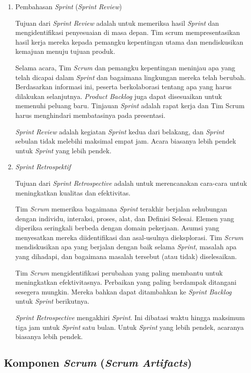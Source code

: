 \begin{enumerate}
		\item Pembahasan \emph{Sprint} (\emph{Sprint Review})
		
		Tujuan dari \emph{Sprint Review} adalah untuk memeriksa hasil \emph{Sprint} dan mengidentifikasi penyesuaian di masa depan. Tim scrum mempresentasikan hasil kerja mereka kepada pemangku kepentingan utama dan mendiskusikan kemajuan menuju tujuan produk.

		Selama acara, Tim \emph{Scrum} dan pemangku kepentingan meninjau apa yang telah dicapai dalam \emph{Sprint} dan bagaimana lingkungan mereka telah berubah. Berdasarkan informasi ini, peserta berkolaborasi tentang apa yang harus dilakukan selanjutnya. \emph{Product Backlog} juga dapat disesuaikan untuk memenuhi peluang baru. Tinjauan \emph{Sprint} adalah rapat kerja dan Tim Scrum harus menghindari membatasinya pada presentasi.

		\emph{Sprint Review} adalah kegiatan \emph{Sprint} kedua dari belakang, dan \emph{Sprint} sebulan tidak melebihi maksimal empat jam. Acara biasanya lebih pendek untuk \emph{Sprint} yang lebih pendek.
				
		\item \emph{Sprint Retrospektif}
		
		Tujuan dari \emph{Sprint Retrospective} adalah untuk merencanakan cara-cara untuk meningkatkan kualitas dan efektivitas.

		Tim \emph{Scrum} memeriksa bagaimana \emph{Sprint} terakhir berjalan sehubungan dengan individu, interaksi, proses, alat, dan Definisi Selesai. Elemen yang diperiksa seringkali berbeda dengan domain pekerjaan. Asumsi yang menyesatkan mereka diidentifikasi dan asal-usulnya dieksplorasi. Tim \emph{Scrum} mendiskusikan apa yang berjalan dengan baik selama \emph{Sprint}, masalah apa yang dihadapi, dan bagaimana masalah tersebut (atau tidak) diselesaikan.

		Tim \emph{Scrum} mengidentifikasi perubahan yang paling membantu untuk meningkatkan efektivitasnya. Perbaikan yang paling berdampak ditangani sesegera mungkin. Mereka bahkan dapat ditambahkan ke \emph{Sprint Backlog} untuk \emph{Sprint} berikutnya.

		\emph{Sprint Retrospective} mengakhiri \emph{Sprint}. Ini dibatasi waktu hingga maksimum tiga jam untuk \emph{Sprint} satu bulan. Untuk \emph{Sprint} yang lebih pendek, acaranya biasanya lebih pendek.
	
	\end{enumerate}

	\subsection{Komponen \emph{Scrum} (\emph{Scrum Artifacts})}
	

